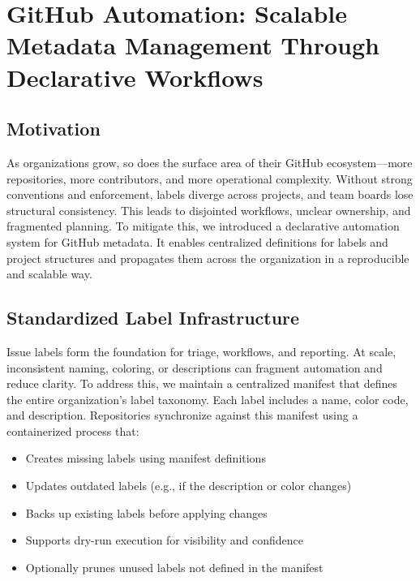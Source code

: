 \documentclass{article}
\begin{document}
\section{GitHub Automation: Scalable Metadata Management Through Declarative Workflows}

\subsection{Motivation}

As organizations grow, so does the surface area of their GitHub ecosystem---more
repositories, more contributors, and more operational complexity. Without strong
conventions and enforcement, labels diverge across projects, and team boards
lose structural consistency. This leads to disjointed workflows, unclear
ownership, and fragmented planning. To mitigate this, we introduced a declarative
automation system for GitHub metadata. It enables centralized definitions for
labels and project structures and propagates them across the organization in a
reproducible and scalable way.

\subsection{Standardized Label Infrastructure}

Issue labels form the foundation for triage, workflows, and reporting. At scale,
inconsistent naming, coloring, or descriptions can fragment automation and reduce
clarity. To address this, we maintain a centralized manifest that defines the entire
organization's label taxonomy. Each label includes a name, color code, and
description. Repositories synchronize against this manifest using a containerized
process that:

\begin{itemize}

  \item Creates missing labels using manifest definitions

  \item Updates outdated labels (e.g., if the description or color changes)

  \item Backs up existing labels before applying changes

  \item Supports dry-run execution for visibility and confidence

  \item Optionally prunes unused labels not defined in the manifest
\end{itemize}
\end{document}

